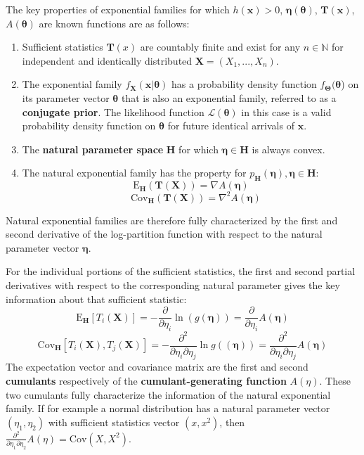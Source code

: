 \documentclass[10pt, a5paper, twoside, openright]{memoir}
\begin{document}
The key properties of exponential families for which $h(\boldsymbol x) > 0$, $\boldsymbol{\eta(\theta)}$, $\boldsymbol{T(x)}$, $A(\boldsymbol \theta)$ are known functions are as follows:
\begin{enumerate}
\item Sufficient statistics $\boldsymbol T(x)$ are countably finite and exist for any $n \in \mathbb N$ for independent and identically distributed $\boldsymbol X = (X_1,...,X_n)$.
\item The exponential family $f_{\boldsymbol X} (\boldsymbol x | \boldsymbol \theta)$ has a probability density function $f_{\boldsymbol \Theta}(\boldsymbol \theta$) on its parameter vector $\boldsymbol \theta$ that is also an exponential family, referred to as a \textbf{conjugate prior}. The likelihood function $\mathcal L(\boldsymbol \theta)$ in this case is a valid probability density function on $\boldsymbol \theta$ for future identical arrivals of $\boldsymbol x$.
\item The \textbf{natural parameter space} $\boldsymbol H$ for which $\boldsymbol \eta \in \boldsymbol H$ is always convex.
\item The natural exponential family has the property for $p_{\boldsymbol H}(\boldsymbol \eta), \boldsymbol \eta \in \boldsymbol H$:
$$\mathrm{E}_{\boldsymbol H}(\boldsymbol {T(X)}) = \nabla A(\boldsymbol \eta)$$
$$\quad \mathrm{Cov}_{\boldsymbol H}(\boldsymbol {T(X)}) = \nabla^2 A(\boldsymbol \eta)$$
\end{enumerate}
Natural exponential families are therefore fully characterized by the first and second derivative of the log-partition function with respect to the natural parameter vector $\boldsymbol \eta$. 

For the individual portions of the sufficient statistics, the first and second partial derivatives with respect to the corresponding natural parameter gives the key information about that sufficient statistic:
$$\mathrm{E}_{\boldsymbol H}[T_i(\boldsymbol X)] = -\frac{\partial}{\partial \eta_i} \ln (g(\boldsymbol \eta)) = \frac{\partial}{\partial \eta_i} A(\boldsymbol \eta)$$
$$\mathrm{Cov}_{\boldsymbol H}[T_i(\boldsymbol X), T_j(\boldsymbol X)] = -\frac{\partial^2}{\partial \eta_i \partial \eta_j} \ln g((\boldsymbol \eta)) = \frac{\partial^2}{\partial \eta_i \partial \eta_j} A(\boldsymbol \eta)$$
The expectation vector and covariance matrix are the first and second \textbf{cumulants} respectively of the \textbf{cumulant-generating function} $A(\eta)$. These two cumulants fully characterize the information of the natural exponential family. If for example a normal distribution has a natural parameter vector $(\eta_1, \eta_2)$ with sufficient statistics vector $(x, x^2)$, then $\frac{\partial^2}{\partial \eta_1 \partial \eta_2} A(\eta) = \mathrm{Cov}(X, X^2)$.
\end{document}
